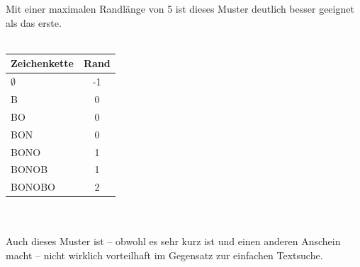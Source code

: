 \documentclass[11pt,a4paper]{scrartcl}
\begin{document}
Mit einer maximalen Randlänge von 5 ist dieses Muster deutlich besser geeignet als das erste. \\\\
\begin{tabular}{|l|c|}
\hline
Zeichenkette & Rand \\
\hline
$\emptyset$ & -1 \\
B & 0 \\
BO & 0 \\
BON & 0 \\
BONO & 1 \\
BONOB & 1 \\
BONOBO & 2 \\
\hline
\end{tabular} \\\\
Auch dieses Muster ist -- obwohl es sehr kurz ist und einen anderen Anschein macht -- nicht wirklich vorteilhaft im Gegensatz zur einfachen Textsuche.
\end{document}
